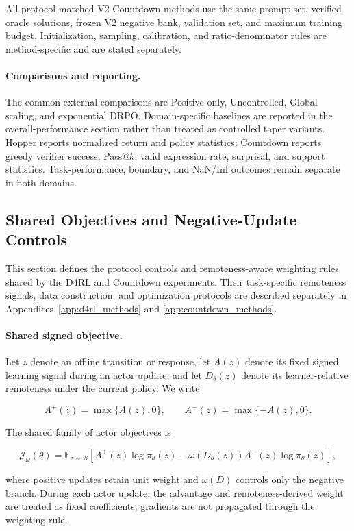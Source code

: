 \documentclass[sigconf,anonymous,review]{acmart}
\theoremstyle{acmdefinition}
\begin{document}
All protocol-matched V2 Countdown methods use the same prompt set,
verified oracle solutions, frozen V2 negative bank, validation set,
and maximum training budget. Initialization, sampling, calibration,
and ratio-denominator rules are method-specific and are stated
separately.

\paragraph{Comparisons and reporting.}
The common external comparisons are Positive-only, Uncontrolled,
Global scaling, and exponential DRPO. Domain-specific baselines are
reported in the overall-performance section rather than treated as
controlled taper variants. Hopper reports normalized return and policy
statistics; Countdown reports greedy verifier success, Pass@$k$, valid
expression rate, surprisal, and support statistics. Task-performance,
boundary, and NaN/Inf outcomes remain separate in both domains.
\subsection{Shared Objectives and Negative-Update Controls}
\label{app:shared_methods}

This section defines the protocol controls and remoteness-aware
weighting rules shared by the D4RL and Countdown experiments. Their
task-specific remoteness signals, data construction, and optimization
protocols are described separately in
Appendices~\ref{app:d4rl_methods} and
\ref{app:countdown_methods}.

\paragraph{Shared signed objective.}

Let \(z\) denote an offline transition or response, let
\(A(z)\) denote its fixed signed learning signal during an actor update,
and let \(D_\theta(z)\) denote its learner-relative remoteness under the
current policy. We write

\[
A^{+}(z)=\max\{A(z),0\},
\qquad
A^{-}(z)=\max\{-A(z),0\}.
\]

The shared family of actor objectives is

\[
\mathcal{J}_{\omega}(\theta)
=
\mathbb{E}_{z\sim\mathcal{B}}
\left[
A^{+}(z)\log \pi_\theta(z)
 -
\omega\!\left(D_\theta(z)\right)
A^{-}(z)\log \pi_\theta(z)
\right],
\]

where positive updates retain unit weight and
\(\omega(D)\) controls only the negative branch. During each actor
update, the advantage and remoteness-derived weight are treated as
fixed coefficients; gradients are not propagated through the weighting
rule.
\end{document}
